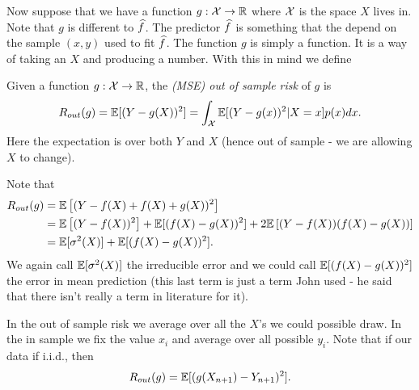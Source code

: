 Now suppose that we have a function $g:{\mathcal{X}} \to {\mathbb R}$ where ${\mathcal{X}}$ is the space $X$ lives in. Note that $g$ is different to $\widehat{f}$. The predictor $\widehat{f}$ is something that the depend on the sample $(x,y)$ used to fit $\widehat{f}$. The function $g$ is simply a function. It is a way of taking an $X$ and producing a number. With this in mind we define
\begin{defn}
    Given a function $g : {\mathcal{X}} \to {\mathbb R}$, the \emph{(MSE) out of sample risk} of $g$ is
    \[R_{out}(g) = {\mathbb{E}}[(Y-g(X))^2] = \int_{\mathcal{X}} {\mathbb{E}}[(Y-g(x))^2|X=x]p(x)dx. \]
    Here the expectation is over both $Y$ and $X$ (hence out of sample - we are allowing $X$ to change).
\end{defn}
Note that 
\begin{align*}
    R_{out}(g) &= {\mathbb{E}}\left[(Y-f(X)+f(X)+g(X))^2\right]\\
&={\mathbb{E}}\left[(Y-f(X))^2\right]+{\mathbb{E}}[(f(X)-g(X))^2]+2{\mathbb{E}}\left[(Y-f(X))(f(X)-g(X))\right]\\
&={\mathbb{E}}[\sigma^2(X)]+{\mathbb{E}}[(f(X)-g(X))^2].
\end{align*}
We again call ${\mathbb{E}}[\sigma^2(X)]$ the irreducible error and we could call ${\mathbb{E}}[(f(X)-g(X))^2]$ the error in mean prediction (this last term is just a term John used - he said that there isn't really a term in literature for it).

In the out of sample risk we average over all the $X$'s we could possible draw. In the in sample we fix the value $x_i$ and average over all possible $y_i$. Note that if our data if i.i.d., then 
\[R_{out}(g) = {\mathbb{E}}[(g(X_{n+1})-Y_{n+1})^2]. \]

 


